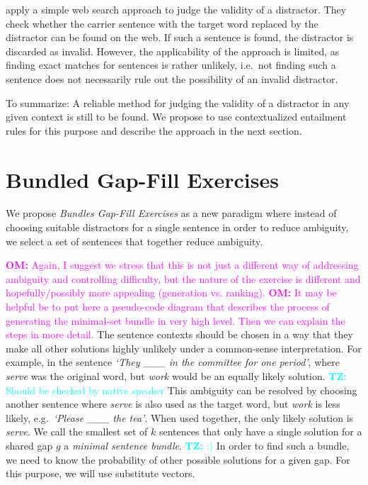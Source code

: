 \documentclass[11pt,letterpaper]{article}
\newcommand{\tz}[1]{\textcolor{cyan}{\textbf{TZ:} #1}}
\newcommand{\om}[1]{\textcolor{magenta}{\textbf{OM:} #1}}
\newcommand{\tz}[1]{}
\newcommand{\om}[1]{}
\begin{document}
 apply a simple web search approach to judge the validity of a distractor.
They check whether the carrier sentence with the target word replaced by the distractor can be found on the web.
If such a sentence is found, the distractor is discarded as invalid.
However, the applicability of the approach is limited, as finding exact matches for sentences is rather unlikely, i.e.\ not finding such a sentence does not necessarily rule out the possibility of an invalid distractor.

To summarize: A reliable method for judging the validity of a distractor in any given context is still to be found.
We propose to use contextualized entailment rules for this purpose and describe the approach in the next section.

\section{Bundled Gap-Fill Exercises}
We propose \textit{Bundles Gap-Fill Exercises} as a new paradigm where instead of choosing suitable distractors for a single sentence in order to reduce ambiguity, we select a set of sentences that together reduce ambiguity.

\om{Again, I suggest we stress that this is not just a different way of addressing ambiguity and controlling difficulty, but the nature of the exercise is different and hopefully/possibly more appealing (generation vs. ranking).}
\om{It may be helpful be to put here a pseudo-code diagram that describes the process of generating the minimal-set bundle in very high level. Then we can explain the steps in more detail.}
The sentence contexts should be chosen in a way that they make all other solutions highly unlikely under a common-sense interpretation.
For example, in the sentence \textit{`They \_\_\_ in the committee for one period'}, where \textit{serve} was the original word, but \textit{work} would be an equally likely solution. \tz{Should be checked by native speaker}
This ambiguity can be resolved by choosing another sentence where \textit{serve}  is also used as the target word, but \textit{work} is less likely, e.g.\ \textit{`Please \_\_\_ the tea'}.
When used together, the only likely solution is \textit{serve}.
We call the smallest set of $k$ sentences that only have a single solution for a shared gap $g$ a \textit{minimal sentence bundle}. \tz{:)}
In order to find such a bundle, we need to know the probability of other possible solutions for a given gap.
For this purpose, we will use substitute vectors.
\end{document}
